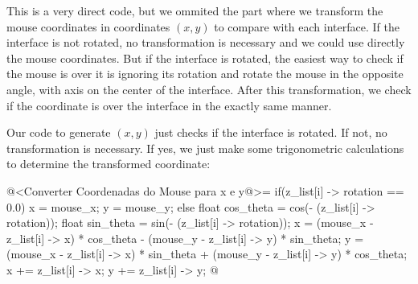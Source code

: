 This is a very direct code, but we ommited the part where we transform
the mouse coordinates in coordinates $(x, y)$ to compare with each
interface. If the interface is not rotated, no transformation is
necessary and we could use directly the mouse coordinates. But if the
interface is rotated, the easiest way to check if the mouse is over it
is ignoring its rotation and rotate the mouse in the opposite angle,
with axis on the center of the interface. After this transformation,
we check if the coordinate is over the interface in the exactly same
manner.

Our code to generate $(x, y)$ just checks if the interface is
rotated. If not, no transformation is necessary. If yes, we just make
some trigonometric calculations to determine the transformed
coordinate:

\iniciocodigo
@<Converter Coordenadas do Mouse para x e y@>=
if(z_list[i] -> rotation == 0.0){
  x = mouse_x;
  y = mouse_y;
}
else{
 float cos_theta = cos(- (z_list[i] -> rotation));
 float sin_theta = sin(- (z_list[i] -> rotation));
 x = (mouse_x - z_list[i] -> x) * cos_theta -
       (mouse_y - z_list[i] -> y) * sin_theta;
 y = (mouse_x - z_list[i] -> x) * sin_theta +
       (mouse_y - z_list[i] -> y) * cos_theta;
 x +=  z_list[i] -> x;
 y +=  z_list[i] -> y;
}
@
\fimcodigo








\fim
